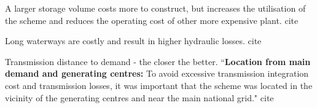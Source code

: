 A larger storage volume costs more to construct, but increases
the utilisation of the scheme and reduces the operating cost of
other more expensive plant. cite \citep{Louwinger2008}

Long waterways are costly and result in higher hydraulic losses. cite \citep{Louwinger2008}

Transmission distance to demand - the closer the better. 
``\textbf{Location from main demand and generating
	centres:} To avoid excessive transmission integration
cost and transmission losses, it was important that the
scheme was located in the vicinity of the generating
centres and near the main national grid."
cite \citep{Louwinger2008}


\begin{comment}
``Economic Conclusions
\hl{Pumped storage is the most cost effective of the large scale energy storage technologies that can be
used in Scotland.} A high level assessment of pumped storage economics suggests that new pumped
storage would be more expensive than constraining renewable energy generation off the network.
This assessment does not include other potential revenues that a pumped storage device may be able
to access but these are unlikely to revise the economic case radically. The conclusion reinforces the
view that accommodating the forecast generating plant mix under the highest renewable energy
Scenarios \hl{will require a wide range of solutions of which the various demand side response measures
enabled by the smart grid and smart meters will be an important and cost effective component.}"
\url{https://www.webarchive.org.uk/wayback/archive/20170113164907/http://www.gov.scot/Publications/2010/10/28091356/14}

``\textbf{Reservoir capacity}
A
larger storage volume costs more to construct, but increases
the utilisation of the scheme and reduces the operating cost of
other more expensive plant.

``\textbf{Waterways}
T h e h o r i z o n tal di s tan c e be twe e n t h e uppe r
a n d l owe r r e s e r v o i r i s n o rma l l y l imi t e d t o
6000 m. Long waterways are costly and result in higher
hydraulic losses.

``\textbf{Location from main demand and generating
centres:} To avoid excessive transmission integration
cost and transmission losses, it was important that the
scheme was located in the vicinity of the generating
centres and near the main national grid."
Case study of Ingula and Lima pumped storage schemes
\end{comment}